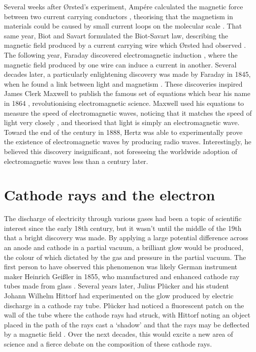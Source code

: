 Several weeks after \O{}rsted's experiment, Amp\'ere calculated the magnetic force between two current carrying conductors \cite{Stohr2006,Hafeli1997,Coey2010,Selvan2007,Stoner1934}, theorising that the magnetism in materials could be caused by small current loops on the molecular scale \cite{Lacheisserie2005}. That same year, Biot and Savart formulated the Biot-Savart law, describing the magnetic field produced by a current carrying wire which \O{}rsted had observed \cite{Stohr2006,Selvan2007,Stoner1934}. The following year, Faraday discovered electromagnetic induction \cite{Coey2010,Lacheisserie2005}, where the magnetic field produced by one wire can induce a current in another. Several decades later, a particularly enlightening discovery was made by Faraday in 1845, when he found a link between light and magnetism \cite{Mattis1981,Mayer2021,Stoner1934,Knudsen1976}. These discoveries inspired James Clerk Maxwell to publish the famous set of equations which bear his name in 1864 \cite{Selvan2007,Mayer2021,Lacheisserie2005,Maxwell1865}, revolutionising electromagnetic science. Maxwell used his equations to measure the speed of electromagnetic waves, noticing that it matches the speed of light very closely \cite{Mayer2021}, and theorised that light is simply an electromagnetic wave. Toward the end of the century in 1888, Hertz was able to experimentally prove the existence of electromagnetic waves \cite{Mayer2021} by producing radio waves. Interestingly, he believed this discovery insignificant, not foreseeing the worldwide adoption of electromagnetic waves less than a century later.

\section*{Cathode rays and the electron}
The discharge of electricity through various gases had been a topic of scientific interest since the early 18th century, but it wasn't until the middle of the 19th that a bright discovery was made. By applying a large potential difference across an anode and cathode in a partial vacuum, a brilliant glow would be produced, the colour of which dictated by the gas and pressure in the partial vacuum. The first person to have observed this phenomenon was likely German instrument maker Heinrich Gei\ss ler in 1855, who manufactured and enhanced cathode ray tubes made from glass \cite{Arabatzis2009}. Several years later, Julius Pl\"ucker and his student Johann Wilhelm Hittorf had experimented on the glow produced by electric discharge in a cathode ray tube. Pl\"ucker had noticed a fluorescent patch on the wall of the tube where the cathode rays had struck, with Hittorf noting an object placed in the path of the rays cast a `shadow' and that the rays may be deflected by a magnetic field \cite{Davis2007}. Over the next decades, this would excite a new area of science and a fierce debate on the composition of these cathode rays.

